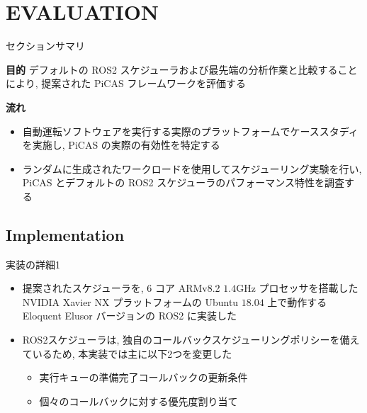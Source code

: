 
\section{EVALUATION}
\label{sec: evaluation}

\begin{frame}{セクションサマリ}
    \begin{itembox}[l]{\textbf{目的}}
        デフォルトの ROS2 スケジューラおよび最先端の分析作業と比較することにより, 提案された PiCAS フレームワークを評価する
    \end{itembox}
    \begin{itembox}[l]{\textbf{流れ}}
        \begin{itemize}
            \item 自動運転ソフトウェアを実行する実際のプラットフォームでケーススタディを実施し, PiCAS の実際の有効性を特定する
            \item ランダムに生成されたワークロードを使用してスケジューリング実験を行い, PiCAS とデフォルトの ROS2 スケジューラのパフォーマンス特性を調査する
        \end{itemize}
    \end{itembox}
\end{frame}


\subsection{Implementation}
\label{ssec: implementation}

\begin{frame}{実装の詳細1}
    \begin{itemize}
        \item 提案されたスケジューラを, 6 コア ARMv8.2 $1.4 \mathrm{GHz}$ プロセッサを搭載した NVIDIA Xavier NX プラットフォームの Ubuntu $18.04$ 上で動作する Eloquent Elusor バージョンの ROS2 に実装した
        \item ROS2スケジューラは, 独自のコールバックスケジューリングポリシーを備えているため, 本実装では主に以下2つを変更した
              \begin{itemize}
                  \item 実行キューの準備完了コールバックの更新条件
                  \item 個々のコールバックに対する優先度割り当て
              \end{itemize}
    \end{itemize}
\end{frame}

